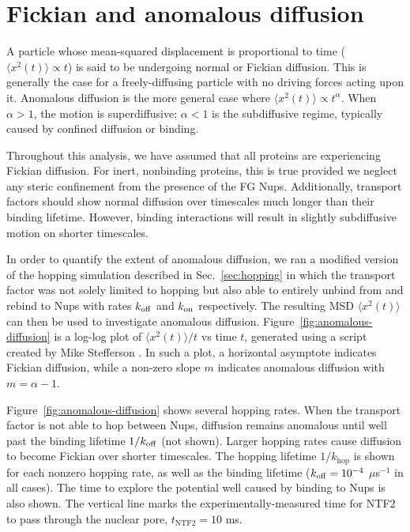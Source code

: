 \section{Fickian and anomalous diffusion}
\label{sec:fickian}
A particle whose mean-squared displacement is proportional to time ($\langle x^2(t) \rangle \propto t$) is said to be undergoing normal or Fickian diffusion.  This is generally the case for a freely-diffusing particle with no driving forces acting upon it.  Anomalous diffusion is the more general case where $\langle x^2(t)\rangle \propto t^\alpha$.  When $\alpha > 1$, the motion is superdiffusive; $\alpha < 1$ is the subdiffusive regime, typically caused by confined diffusion or binding.

Throughout this analysis, we have assumed that all proteins are experiencing Fickian diffusion.  For inert, nonbinding proteins, this is true provided we neglect any steric confinement from the presence of the FG Nups.  Additionally, transport factors should show normal diffusion over timescales much longer than their binding lifetime.  However, binding interactions will result in slightly subdiffusive motion on shorter timescales.

In order to quantify the extent of anomalous diffusion, we ran a modified version of the hopping simulation described in Sec.~\ref{sec:hopping} in which the transport factor was not solely limited to hopping but also able to entirely unbind from and rebind to Nups with rates $k_{\rm off}$ and $k_{\rm on}$ respectively.   The resulting MSD $\langle x^2(t) \rangle$ can then be used to investigate anomalous diffusion.  Figure~\ref{fig:anomalous-diffusion} is a log-log plot of $\langle x^2(t) \rangle/t$ vs time $t$, generated using a script created by Mike Stefferson \cite{stefferson18}.  In such a plot, a horizontal asymptote indicates Fickian diffusion, while a non-zero slope $m$ indicates anomalous diffusion with $m = \alpha -1$.

Figure~\ref{fig:anomalous-diffusion} shows several hopping rates.  When the transport factor is not able to hop between Nups, diffusion remains anomalous until well past the binding lifetime $1/k_{\rm off}$ (not shown).  Larger hopping rates cause diffusion to become Fickian over shorter timescales.  The hopping lifetime $1/k_\mathrm{hop}$ is shown for each nonzero hopping rate, as well as the binding lifetime ($k_{\rm off} = 10^{-4}$ $\mu$s$^{-1}$ in all cases).  The time to explore the potential well caused by binding to Nups is also shown.  The vertical line marks the experimentally-measured time for NTF2 to pass through the nuclear pore, $t_\mathrm{NTF2} = 10$ ms.

